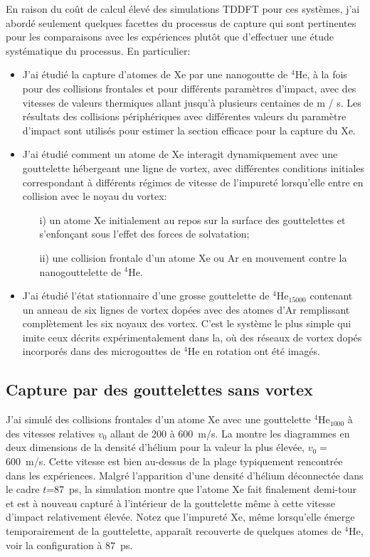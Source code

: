 		En raison du coût de calcul élevé des simulations TDDFT pour ces systèmes, j'ai abordé seulement quelques facettes du processus de capture qui sont pertinentes pour les comparaisons avec les expériences plutôt que d'effectuer une étude systématique du processus. 
		En particulier:
		\begin{itemize}
			\item J'ai étudié la capture d'atomes de Xe par une nanogoutte de $^4$He, à la fois pour des collisions frontales et pour différents paramètres d'impact, avec des vitesses de valeurs thermiques allant jusqu'à plusieurs centaines de m / s. 
			Les résultats des collisions périphériques avec différentes valeurs du paramètre d'impact sont utilisés pour estimer la section efficace pour la capture du Xe.
			\item J'ai étudié comment un atome de Xe interagit dynamiquement avec une gouttelette hébergeant une ligne de vortex, avec différentes conditions initiales correspondant à différents régimes de vitesse de l'impureté lorsqu'elle entre en collision avec le noyau du vortex:
			\begin{enumerate}
				\item[i)] un atome Xe initialement au repos sur la surface des gouttelettes et s'enfonçant sous l'effet des forces de solvatation;
				\item[ii)] une collision frontale d'un atome Xe ou Ar en mouvement contre la nanogouttelette de $^4$He.
			\end{enumerate}
			\item J'ai étudié l'état stationnaire d'une grosse gouttelette de $^4$He$_{15000}$ contenant un anneau de six lignes de vortex dopées avec des atomes d'Ar remplissant complètement les six noyaux des vortex. 
			C'est le système le plus simple qui imite ceux décrits expérimentalement dans la, où des réseaux de vortex dopés incorporés dans des microgouttes de $^4$He en rotation ont été imagés.
		\end{itemize}

		\subsection*{Capture par des gouttelettes sans vortex}
			J'ai simulé des collisions frontales d'un atome Xe avec une gouttelette $^4$He$_{1000}$ à des vitesses relatives $v_0$ allant de 200 à 600~m/s. 
			La  montre les diagrammes en deux dimensions de la densité d'hélium pour la valeur la plus élevée, $v_0\!=$600~m/s. 
			Cette vitesse est bien au-dessus de la plage typiquement rencontrée dans les expériences\citep{Gom11,Gom14,Jones2016}. 
			Malgré l'apparition d'une densité d'hélium déconnectée dans le cadre $t$=87~ps, la simulation montre que l'atome Xe fait finalement demi-tour et est à nouveau capturé à l'intérieur de la gouttelette même à cette vitesse d'impact relativement élevée. 
			Notez que l'impureté Xe, même lorsqu'elle émerge temporairement de la gouttelette, apparaît recouverte de quelques atomes de $^4$He, voir la configuration à 87~ps.

